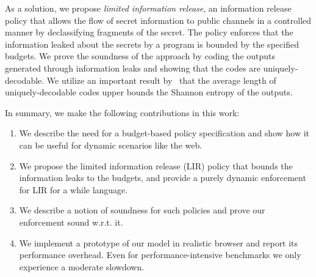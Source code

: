 As a solution, we propose \emph{limited information release}, an
information release policy that allows the flow of secret information
to public channels in a controlled manner by declassifying
fragments of the secret. The policy enforces that the information
leaked about the secrets by a program is bounded by the specified
budgets. We prove the soundness of the approach by coding the
outputs generated through information leaks and showing that the codes
are uniquely-decodable. We utilize an important result
by~\cite{shannon} that the average length of uniquely-decodable codes
upper bounds the Shannon entropy of the outputs.

In summary, we make the following contributions in this work:
\begin{enumerate}
\item We describe the need for a budget-based policy specification and
  show how it can be useful for dynamic scenarios like the web.
\item We propose the limited information release (LIR) policy that
  bounds the information leaks to the budgets, and 
  provide a purely dynamic enforcement for LIR for a while language.
\item We describe a notion of soundness for such policies and prove
  our enforcement sound w.r.t. it.
\item We implement a prototype of our model in realistic
  browser and report its performance overhead. Even for
  performance-intensive benchmarks we only experience a moderate slowdown.
\end{enumerate}














